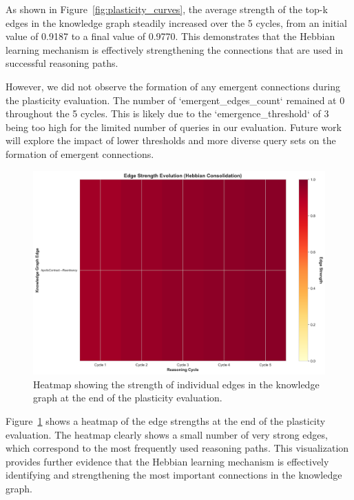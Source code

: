 As shown in Figure~\ref{fig:plasticity_curves}, the average strength of the top-k edges in the knowledge graph steadily increased over the 5 cycles, from an initial value of 0.9187 to a final value of 0.9770. This demonstrates that the Hebbian learning mechanism is effectively strengthening the connections that are used in successful reasoning paths.

However, we did not observe the formation of any emergent connections during the plasticity evaluation. The number of `emergent_edges_count` remained at 0 throughout the 5 cycles. This is likely due to the `emergence_threshold` of 3 being too high for the limited number of queries in our evaluation. Future work will explore the impact of lower thresholds and more diverse query sets on the formation of emergent connections.

\begin{figure}[h]
    \centering
    \includegraphics[width=0.8\linewidth]{output/quick_eval_20251027_015729/figures/edge_strength_heatmap.png}
    \caption{Heatmap showing the strength of individual edges in the knowledge graph at the end of the plasticity evaluation.}
    \label{fig:heatmap}
\end{figure}

Figure~\ref{fig:heatmap} shows a heatmap of the edge strengths at the end of the plasticity evaluation. The heatmap clearly shows a small number of very strong edges, which correspond to the most frequently used reasoning paths. This visualization provides further evidence that the Hebbian learning mechanism is effectively identifying and strengthening the most important connections in the knowledge graph.
